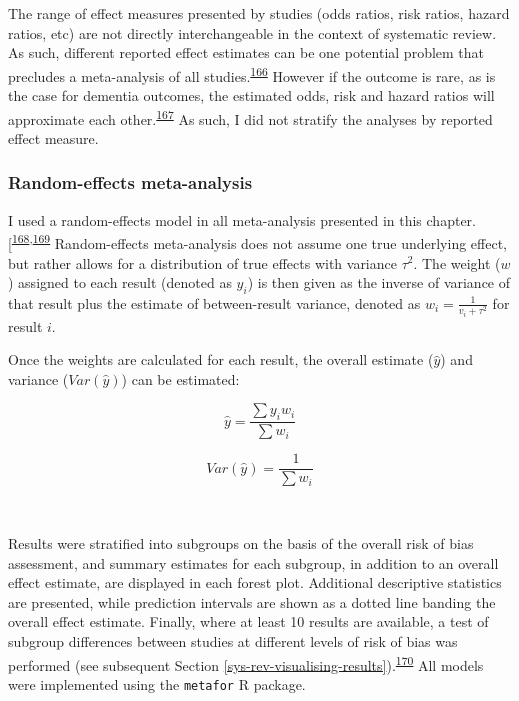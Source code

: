 \documentclass[a4paper, twoside]{templates/ociamthesis}
\begin{document}
The range of effect measures presented by studies (odds ratios, risk ratios, hazard ratios, etc) are not directly interchangeable in the context of systematic review. As such, different reported effect estimates can be one potential problem that precludes a meta-analysis of all studies.\textsuperscript{\protect\hyperlink{ref-mckenzie2019}{166}} However if the outcome is rare, as is the case for dementia outcomes, the estimated odds, risk and hazard ratios will approximate each other.\textsuperscript{\protect\hyperlink{ref-vanderweele2020}{167}} As such, I did not stratify the analyses by reported effect measure.

\hypertarget{random-effects-meta-analysis}{%
\subsubsection{Random-effects meta-analysis}\label{random-effects-meta-analysis}}

I used a random-effects model in all meta-analysis presented in this chapter.{[}\textsuperscript{\protect\hyperlink{ref-hedges1998}{168},\protect\hyperlink{ref-dersimonian1986}{169}} Random-effects meta-analysis does not assume one true underlying effect, but rather allows for a distribution of true effects with variance \(\tau^2\). The weight (\(w\)) assigned to each result (denoted as \(y_i\)) is then given as the inverse of variance of that result plus the estimate of between-result variance, denoted as \(w_i = \frac{1}{v_i+\tau^2}\) for result \(i\).

Once the weights are calculated for each result, the overall estimate (\(\hat{y}\)) and variance (\(Var(\hat{y})\)) can be estimated:

\begin{equation}
\hat{y} = \frac{\sum{y_iw_i}}{\sum{w_i}}
  \label{eq:rmaEstimate}
\end{equation}

\begin{equation}
Var(\hat{y}) = \frac{1}{\sum{w_i}}
  \label{eq:rmaVariance}
\end{equation}

~

Results were stratified into subgroups on the basis of the overall risk of bias assessment, and summary estimates for each subgroup, in addition to an overall effect estimate, are displayed in each forest plot. Additional descriptive statistics are presented, while prediction intervals are shown as a dotted line banding the overall effect estimate. Finally, where at least 10 results are available, a test of subgroup differences between studies at different levels of risk of bias was performed (see subsequent Section \ref{sys-rev-visualising-results}).\textsuperscript{\protect\hyperlink{ref-deeks2019}{170}} All models were implemented using the \texttt{metafor} R package.
\end{document}
